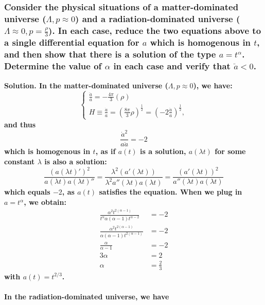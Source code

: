 \documentclass{article}
\begin{document}
\subsubsection*{Consider the physical situations of a matter-dominated universe ($\Lambda, p \approx 0$) and a radiation-dominated universe ($\Lambda \approx 0, p=\frac{\rho}{3}$). In each case, reduce the two equations above to a single differential equation for $a$ which is homogenous in $t$, and then show that there is a solution of the type $a=t^{\alpha}$. Determine the value of $\alpha$ in each case and verify that $\ddot{a}<0$.}
\bf Solution. \normalfont In the matter-dominated universe ($\Lambda, p \approx 0$), we have:
\begin{equation*}
    \begin{cases}
        \frac{\ddot{a}}{a}=-\frac{4\pi}{3}(\rho)\\
        H\equiv \frac{\dot{a}}{a} = (\frac{8\pi}{3}\rho)^{\frac{1}{2}} = (-2\frac{\ddot{a}}{a})^{\frac{1}{2}},
    \end{cases}
\end{equation*}
and thus 
\begin{equation*}
    \frac{\dot{a}^2}{a\ddot{a}} = -2
\end{equation*}
which is homogenous in $t$, as if $a(t)$ is a solution, $a(\lambda t)$ for some constant $\lambda$ is also a solution:
\begin{equation*}
    \frac{(a(\lambda t)')^2}{a(\lambda t)a(\lambda t)''} = \frac{\lambda^2(a'(\lambda t))}{\lambda^2 a''(\lambda t) a(\lambda t)} = \frac{(a'(\lambda t))^2}{a''(\lambda t)a(\lambda t)}
\end{equation*}
which equals $-2$, as $a(t)$ satisfies the equation. When we plug in $a = t^{\alpha}$, we obtain:
\begin{equation*}
    \begin{aligned}
        \frac{\alpha^2 t^{2(\alpha - 1)}}{t^\alpha \alpha(\alpha - 1)t^{\alpha - 2}} &= -2 \\
        \frac{\alpha^2 t^{2(\alpha-1)}}{\alpha(\alpha - 1) t^{2(\alpha - 1)}} &= -2 \\
        \frac{\alpha}{\alpha - 1} &= - 2 \\
        3\alpha &= 2 \\
        \alpha &= \frac{2}{3}
    \end{aligned}
\end{equation*}
with $a(t)=t^{2/3}$. \\ \\
In the radiation-dominated universe, we have
\end{document}
